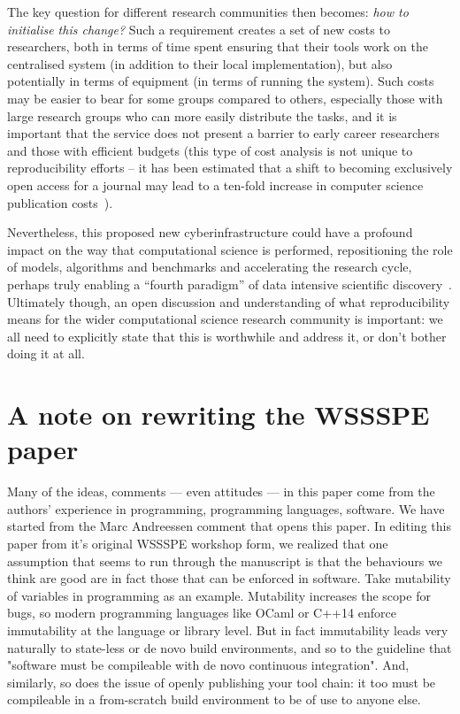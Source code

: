 \documentclass[a4paper,11pt]{article}
\begin{document}
The key question for different research communities then becomes:
{\emph{how to initialise this change?}} Such a requirement creates a
set of new costs to researchers, both in terms of time spent ensuring
that their tools work on the centralised system (in addition to their
local implementation), but also potentially in terms of equipment (in
terms of running the system). Such costs may be easier to bear for
some groups compared to others, especially those with large research
groups who can more easily distribute the tasks, and it is important
that the service does not present a barrier to early career
researchers and those with efficient budgets (this type of cost
analysis is not unique to reproducibility efforts -- it has been
estimated that a shift to becoming exclusively open access for a
journal may lead to a ten-fold increase in computer science
publication costs~\cite{vardi-cacm-2014}).

Nevertheless, this proposed new cyberinfrastructure could have a
profound impact on the way that computational science is performed,
repositioning the role of models, algorithms and benchmarks and
accelerating the research cycle, perhaps truly enabling a ``fourth
paradigm'' of data intensive scientific discovery~\cite{hey:2009}.
Ultimately though, an open discussion and understanding of what
reproducibility means for the wider computational science research
community is important: we all need to explicitly state that this is
worthwhile and address it, or don't bother doing it at all.

\section{A note on rewriting the WSSSPE paper}

Many of the ideas, comments --- even attitudes --- in this paper come 
from the authors' experience in programming, programming languages, 
software. We have started from the Marc Andreessen 
comment that opens this paper. In editing this paper from it's 
original WSSSPE workshop form,  we realized that one assumption that 
seems to run through the manuscript  is that the behaviours we think 
are good are in fact those that can be enforced in software. 
Take mutability of variables in programming as an example. Mutability 
increases the scope for bugs, so modern programming languages like OCaml 
or C++14 enforce immutability at the language or library level. But 
in fact immutability leads very naturally to state-less or de novo
build environments, and so to the guideline that "software must be compileable
with de novo continuous integration". 
And, similarly, so does the issue of openly publishing your tool chain:
it too must be compileable in a from-scratch build environment to be of 
use to anyone else. 




\end{document}
